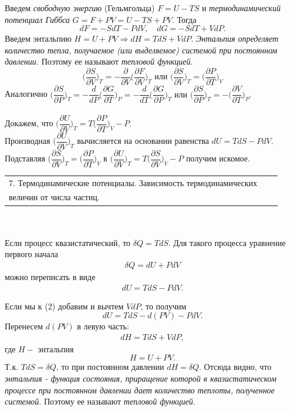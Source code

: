 \documentclass[14pt,a4paper]{scrartcl}
\begin{document}
	\quad Введем \textit{свободную энергию} (Гельмгольца) $F = U - TS$ и \textit{термодинамический потенциал Гиббса} $G = F + PV = U - TS + PV$. Тогда $$dF = -SdT -PdV, \quad dG = -SdT +VdP.$$
	\quad Введем энтальпию $H = U + PV \Rightarrow dH = TdS +VdP$. \textit{Энтальпия определяет количество тепла, получаемое (или выделяемое) системой при постоянном давлении.} Поэтому ее называют \textit{тепловой функцией}.
	$$\biggl(\dfrac{\partial S}{\partial V}\biggr)_T=-\dfrac{\partial }{\partial V}\biggl(\dfrac{\partial F}{\partial V}\biggr)_T \text{ или } \biggl(\dfrac{\partial S}{\partial V}\biggr)_T = \biggl(\dfrac{\partial P}{\partial T}\biggr)_V$$
	\quad Аналогично $\biggl(\dfrac{\partial S}{\partial P}\biggr)_T = -\dfrac{d }{d P}\biggl(\dfrac{\partial G}{\partial T}\biggr)_P = -\dfrac{d }{d T}\biggl(\dfrac{\partial G}{\partial P}\biggr)_T \text{ или } \biggl(\dfrac{\partial S}{\partial P}\biggr)_T = -\biggl(\dfrac{\partial V}{\partial T}\biggr)_P$.\\\\
	
	\quad Докажем, что	$\biggl(\dfrac{\partial U}{\partial V}\biggr)_T = T\biggl(\dfrac{\partial P}{\partial T}\biggr)_V - P.$\\
	\quad Производная $\biggl(\dfrac{\partial U}{\partial V}\biggr)_T $ вычисляется на основании равенства $dU = TdS - PdV$. Подставляя 	$\biggl(\dfrac{\partial S}{\partial V}\biggr)_T = \biggl(\dfrac{\partial P}{\partial T}\biggr)_V$ в 
	$\biggl(\dfrac{\partial U}{\partial V}\biggr)_T = T\biggl(\dfrac{\partial S}{\partial V}\biggr)_V - P$ получим искомое.\\


	\begin{tabular}[t]{|l|ll|} 
		\hline
		7. Термодинамические потенциалы. Зависимость термодинамических \\величин от числа частиц.\\
		\hline
	\end{tabular}\\\\

	\quad Если процесс квазистатический, то $\delta Q = TdS$. Для такого процесса уравнение первого начала \begin{align}
	\delta Q = dU +PdV \tag{1}
	\end{align}
	можно переписать в виде 
	\begin{align}
	dU = TdS - PdV. \tag{2}
	\end{align}
	
	Если мы к (2) добавим и вычтем $VdP$, то получим $$dU = TdS - d(PV)- PdV.$$ 
	Перенесем $d(PV)$ в левую часть:
	\begin{align}
	dH = TdS +VdP, \tag{3}
	\end{align}
	где $H - $ энтальпия $$H = U +PV.$$ 
	\quad Т.к. $TdS = \delta Q$, то при постоянном давлении $dH = \delta Q$. Отсюда видно, что \textit{энтальпия - функция состояния, приращение которой в квазистатическом процессе при постоянном давлении дает количество теплоты, полученное системой}. Поэтому ее называют \textit{тепловой функцией}.
	
\end{document}
